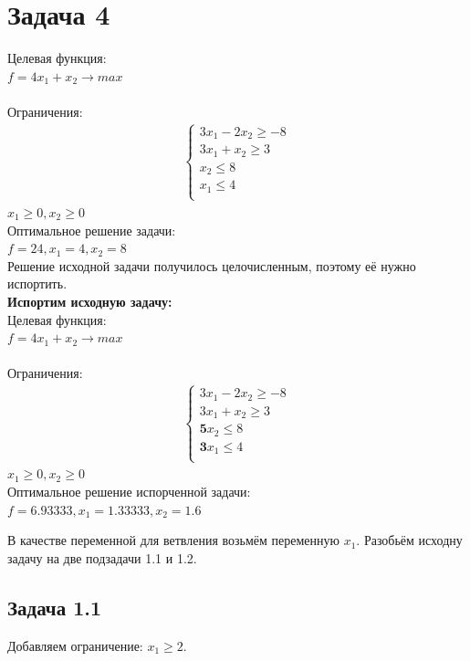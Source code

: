 \documentclass[14pt,a4paper,fleqn]{extarticle}
\begin{document}
	\section*{Задача 4}
	Целевая функция:\\
	$f = 4x_1+x_2 \longrightarrow max$\\\\
	Ограничения:
	\begin{align*}
		\begin{cases}
			3x_1 - 2x_2 \geq -8\\
			3x_1 + x_2 \geq 3\\
			x_2 \leq 8\\
			x_1 \leq 4\\
		\end{cases}
	\end{align*}
	$x_1 \geq 0, x_2 \geq 0$\\
	
	Оптимальное решение задачи:\\
	$f = 24, x_1 = 4, x_2 = 8$\\
	Решение исходной задачи получилось целочисленным, поэтому её нужно испортить.\\
	
	\textbf{Испортим исходную задачу:}\\
	
	Целевая функция:\\
	$f = 4x_1+x_2 \longrightarrow max$\\\\
	Ограничения:
	\begin{align*}
		\begin{cases}
			3x_1 - 2x_2 \geq -8\\
			3x_1 + x_2 \geq 3\\
			\boldsymbol{5} x_2 \leq 8\\
			\boldsymbol{3} x_1 \leq 4\\
		\end{cases}
	\end{align*}
	$x_1 \geq 0, x_2 \geq 0$\\
	
	Оптимальное решение испорченной задачи:\\
	$f = 6.93333, x_1 = 1.33333, x_2 = 1.6$
	\newpage
	
	В качестве переменной для ветвления возьмём переменную $x_1$. Разобьём исходну задачу на две подзадачи 1.1 и 1.2.
	\subsection*{Задача 1.1}
	Добавляем ограничение: $x_1 \geq 2$.\\
	
\end{document}

